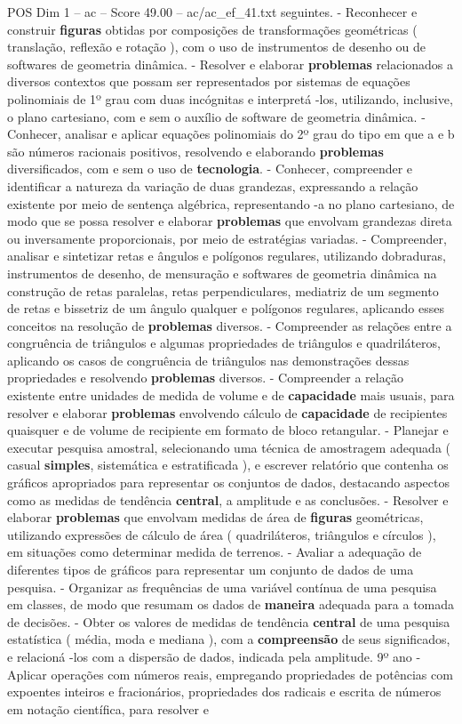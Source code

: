 \begin{textsample}{POS Dim 1 – ac – Score 49.00 – ac/ac\_ef\_41.txt}
seguintes. - Reconhecer e construir \textbf{figuras} obtidas por composições de transformações geométricas ( translação, reflexão e rotação ), com o uso de instrumentos de desenho ou de softwares de geometria dinâmica. - Resolver e elaborar \textbf{problemas} relacionados a diversos contextos que possam ser representados por sistemas de equações polinomiais de 1º grau com duas incógnitas e interpretá -los, utilizando, inclusive, o plano cartesiano, com e sem o auxílio de software de geometria dinâmica. - Conhecer, analisar e aplicar equações polinomiais do 2º grau do tipo em que a e b são números racionais positivos, resolvendo e elaborando \textbf{problemas} diversificados, com e sem o uso de \textbf{tecnologia}. - Conhecer, compreender e identificar a natureza da variação de duas grandezas, expressando a relação existente por meio de sentença algébrica, representando -a no plano cartesiano, de modo que se possa resolver e elaborar \textbf{problemas} que envolvam grandezas direta ou inversamente proporcionais, por meio de estratégias variadas. - Compreender, analisar e sintetizar retas e ângulos e polígonos regulares, utilizando dobraduras, instrumentos de desenho, de mensuração e softwares de geometria dinâmica na construção de retas paralelas, retas perpendiculares, mediatriz de um segmento de retas e bissetriz de um ângulo qualquer e polígonos regulares, aplicando esses conceitos na resolução de \textbf{problemas} diversos. - Compreender as relações entre a congruência de triângulos e algumas propriedades de triângulos e quadriláteros, aplicando os casos de congruência de triângulos nas demonstrações dessas propriedades e resolvendo \textbf{problemas} diversos. - Compreender a relação existente entre unidades de medida de volume e de \textbf{capacidade} mais usuais, para resolver e elaborar \textbf{problemas} envolvendo cálculo de \textbf{capacidade} de recipientes quaisquer e de volume de recipiente em formato de bloco retangular. - Planejar e executar pesquisa amostral, selecionando uma técnica de amostragem adequada ( casual \textbf{simples}, sistemática e estratificada ), e escrever relatório que contenha os gráficos apropriados para representar os conjuntos de dados, destacando aspectos como as medidas de tendência \textbf{central}, a amplitude e as conclusões. - Resolver e elaborar \textbf{problemas} que envolvam medidas de área de \textbf{figuras} geométricas, utilizando expressões de cálculo de área ( quadriláteros, triângulos e círculos ), em situações como determinar medida de terrenos. - Avaliar a adequação de diferentes tipos de gráficos para representar um conjunto de dados de uma pesquisa. - Organizar as frequências de uma variável contínua de uma pesquisa em classes, de modo que resumam os dados de \textbf{maneira} adequada para a tomada de decisões. - Obter os valores de medidas de tendência \textbf{central} de uma pesquisa estatística ( média, moda e mediana ), com a \textbf{compreensão} de seus significados, e relacioná -los com a dispersão de dados, indicada pela amplitude. 9º ano - Aplicar operações com números reais, empregando propriedades de potências com expoentes inteiros e fracionários, propriedades dos radicais e escrita de números em notação científica, para resolver e 
\end{textsample}
